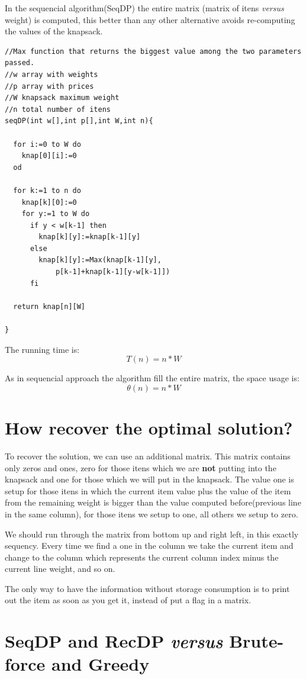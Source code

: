 \documentclass{article}
\begin{document}
In the sequencial algorithm(SeqDP) the entire matrix (matrix of itens \textit{versus} weight) is computed, this 
better than any other alternative avoids re-computing the values of the knapsack.

\begin{lstlisting}
//Max function that returns the biggest value among the two parameters passed.
//w array with weights
//p array with prices
//W knapsack maximum weight
//n total number of itens
seqDP(int w[],int p[],int W,int n){

  for i:=0 to W do
    knap[0][i]:=0
  od

  for k:=1 to n do
    knap[k][0]:=0
    for y:=1 to W do
      if y < w[k-1] then
        knap[k][y]:=knap[k-1][y]
      else
        knap[k][y]:=Max(knap[k-1][y],
			p[k-1]+knap[k-1][y-w[k-1]])
      fi

  return knap[n][W]

}
\end{lstlisting}

The running time is:
\[
T(n)=n*W
\]

As in sequencial approach the algorithm fill the entire matrix, the space usage is:
\[
\theta(n)=n*W
\]

\section{How recover the optimal solution?}          

To recover the solution, we can use an additional matrix. This matrix contains only zeros and ones, zero for those itens which we are \textbf{not}
putting into the knapsack and one for those which we will put in the knapsack. The value one is setup for those itens in which the current 
item value plus the value of the item from the remaining weight is bigger than the value computed before(previous line in the same column), 
for those itens we setup to one, all others we setup to zero.

We should run through the matrix from bottom up and right left, in this exactly sequency. Every time we find a one in the column we take the current 
item and change to the column which represents the current column index minus the current line weight, and so on.

The only way to have the information without storage consumption is to print out the item as soon as you get it, instead of put a flag in a matrix.

\section{SeqDP and RecDP \textit{versus} Brute-force and Greedy}
\end{document}
